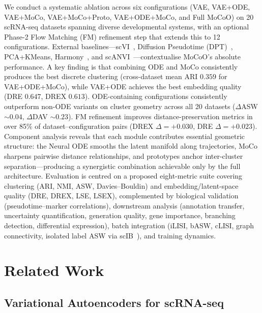 \documentclass[preprint,12pt,number]{elsarticle}
\begin{document}
We conduct a systematic ablation across six configurations (VAE, VAE+ODE, VAE+MoCo, VAE+MoCo+Proto, VAE+ODE+MoCo, and Full MoCoO) on 20 scRNA-seq datasets spanning diverse developmental systems, with an optional Phase-2 Flow Matching (FM) refinement step that extends this to 12 configurations. External baselines---scVI~\cite{lopez2018deep}, Diffusion Pseudotime (DPT)~\cite{haghverdi2016dpt}, PCA+KMeans, Harmony~\cite{korsunsky2019harmony}, and scANVI~\cite{xu2021probabilistic}---contextualise MoCoO's absolute performance. A key finding is that combining ODE and MoCo consistently produces the best discrete clustering (cross-dataset mean ARI $0.359$ for VAE+ODE+MoCo), while VAE+ODE achieves the best embedding quality (DRE $0.647$, DREX $0.613$). ODE-containing configurations consistently outperform non-ODE variants on cluster geometry across all 20 datasets ($\Delta$ASW ${\sim}0.04$, $\Delta$DAV ${\sim}0.23$). FM refinement improves distance-preservation metrics in over 85\% of dataset--configuration pairs (DREX $\Delta{=}+0.030$, DRE $\Delta{=}+0.023$). Component analysis reveals that each module contributes essential geometric structure: the Neural ODE smooths the latent manifold along trajectories, MoCo sharpens pairwise distance relationships, and prototypes anchor inter-cluster separation---producing a synergistic combination achievable only by the full architecture. Evaluation is centred on a proposed eight-metric suite covering clustering (ARI, NMI, ASW, Davies--Bouldin) and embedding/latent-space quality (DRE, DREX, LSE, LSEX), complemented by biological validation (pseudotime--marker correlations), downstream analysis (annotation transfer, uncertainty quantification, generation quality, gene importance, branching detection, differential expression), batch integration (iLISI, bASW, cLISI, graph connectivity, isolated label ASW via scIB~\cite{luecken2022scib}), and training dynamics.

\section{Related Work}
\label{sec:related}

\subsection{Variational Autoencoders for scRNA-seq}
\label{sec:related:vae}
\end{document}
